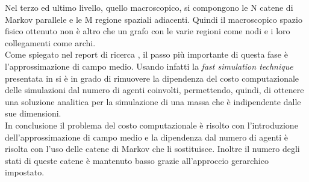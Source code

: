 Nel terzo ed ultimo livello, quello macroscopico, si compongono le N catene di Markov parallele e le M regione spaziali adiacenti. Quindi il macroscopico spazio fisico ottenuto non è altro che un grafo con le varie regioni come nodi e i loro collegamenti come archi.\\
Come spiegato nel report di ricerca \cite{hierarchical-report}, il passo più importante di questa fase è l'approssimazione di campo medio. Usando infatti la \textit{fast simulation technique} presentata in \cite{mean-field} si è in grado di rimuovere la dipendenza del costo computazionale delle simulazioni dal numero di agenti coinvolti, permettendo, quindi, di ottenere una soluzione analitica per la simulazione di una massa che è indipendente dalle sue dimensioni.\\
In conclusione il problema del costo computazionale è risolto con l'introduzione dell'approssimazione di campo medio e la dipendenza dal numero di agenti è risolta con l'uso delle catene di Markov che li sostituisce. Inoltre il numero degli stati di queste catene è mantenuto basso grazie all'approccio gerarchico impostato.

